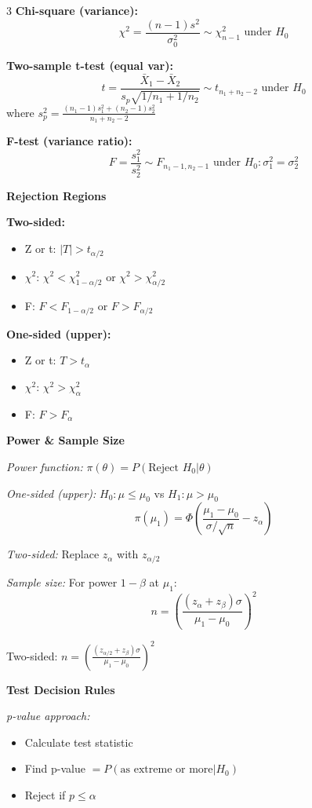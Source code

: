 \documentclass[10pt,letterpaper]{article}
\begin{document}
\begin{multicols}{3}
\textbf{Chi-square (variance):}
$$\chi^2 = \frac{(n-1)s^2}{\sigma_0^2} \sim \chi^2_{n-1} \text{ under } H_0$$

\textbf{Two-sample t-test (equal var):}
$$t = \frac{\bar{X}_1 - \bar{X}_2}{s_p\sqrt{1/n_1 + 1/n_2}} \sim t_{n_1+n_2-2} \text{ under } H_0$$
where $s_p^2 = \frac{(n_1-1)s_1^2 + (n_2-1)s_2^2}{n_1+n_2-2}$

\textbf{F-test (variance ratio):}
$$F = \frac{s_1^2}{s_2^2} \sim F_{n_1-1, n_2-1} \text{ under } H_0: \sigma_1^2 = \sigma_2^2$$

\textbf{Rejection Regions}

\textbf{Two-sided:}
\begin{itemize}
\item Z or t: $|T| > t_{\alpha/2}$
\item $\chi^2$: $\chi^2 < \chi^2_{1-\alpha/2}$ or $\chi^2 > \chi^2_{\alpha/2}$
\item F: $F < F_{1-\alpha/2}$ or $F > F_{\alpha/2}$
\end{itemize}

\textbf{One-sided (upper):}
\begin{itemize}
\item Z or t: $T > t_\alpha$
\item $\chi^2$: $\chi^2 > \chi^2_\alpha$
\item F: $F > F_\alpha$
\end{itemize}

\textbf{Power \& Sample Size}

\textit{Power function:} $\pi(\theta) = P(\text{Reject } H_0 | \theta)$

\textit{One-sided (upper):} $H_0: \mu \le \mu_0$ vs $H_1: \mu > \mu_0$
$$\pi(\mu_1) = \Phi\left(\frac{\mu_1 - \mu_0}{\sigma/\sqrt{n}} - z_\alpha\right)$$

\textit{Two-sided:} Replace $z_\alpha$ with $z_{\alpha/2}$

\textit{Sample size:} For power $1-\beta$ at $\mu_1$:
$$n = \left(\frac{(z_\alpha + z_\beta)\sigma}{\mu_1 - \mu_0}\right)^2$$

Two-sided: $n = \left(\frac{(z_{\alpha/2} + z_\beta)\sigma}{\mu_1 - \mu_0}\right)^2$

\textbf{Test Decision Rules}

\textit{p-value approach:}
\begin{itemize}
\item Calculate test statistic
\item Find p-value $= P(\text{as extreme or more} | H_0)$
\item Reject if $p \le \alpha$
\end{itemize}


\end{multicols}
\end{document}
